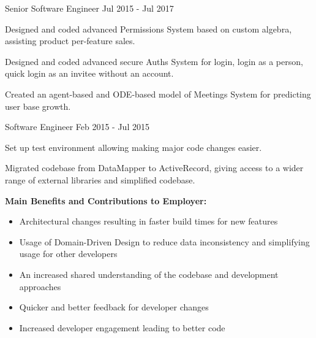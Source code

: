 \begin{cventries}
    \cventry
    {Senior Software Engineer} %
    {} %
    {} %
    {Jul 2015 - Jul 2017} %
    {
      \begin{cvitems} %
        \item {Designed and coded advanced Permissions System based on custom algebra, assisting product per-feature sales.}
        \item {Designed and coded advanced secure Auths System for login, login as a person, quick login as an invitee without an account.}
        \item {Created an agent-based and ODE-based model of Meetings System for predicting user base growth.}
      \end{cvitems}
    }

    \cventry
    {Software Engineer} %
    {} %
    {} %
    {Feb 2015 - Jul 2015} %
    {
      \begin{cvitems} %
        \item {Set up test environment allowing making major code changes easier.}
        \item {Migrated codebase from DataMapper to ActiveRecord, giving access to a wider range of external libraries and simplified codebase.}
      \end{cvitems}
    }

\end{cventries}

\begin{cvparagraph}

\textbf{Main Benefits and Contributions to Employer:}

\begin{itemize}
  \item Architectural changes resulting in faster build times for new features
  \item Usage of Domain-Driven Design to reduce data inconsistency and simplifying usage for other developers
  \item An increased shared understanding of the codebase and development approaches
  \item Quicker and better feedback for developer changes
  \item Increased developer engagement leading to better code
\end{itemize}

\end{cvparagraph}



